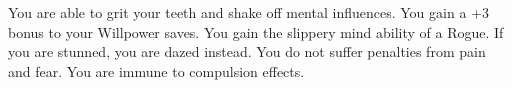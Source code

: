\combatfeat
{You are able to grit your teeth and shake off mental influences.}
{You gain a +3 bonus to your Willpower saves.}
{You gain the slippery mind ability of a Rogue.}
{If you are stunned, you are dazed instead.}
{You do not suffer penalties from pain and fear.}
{You are immune to compulsion effects.}